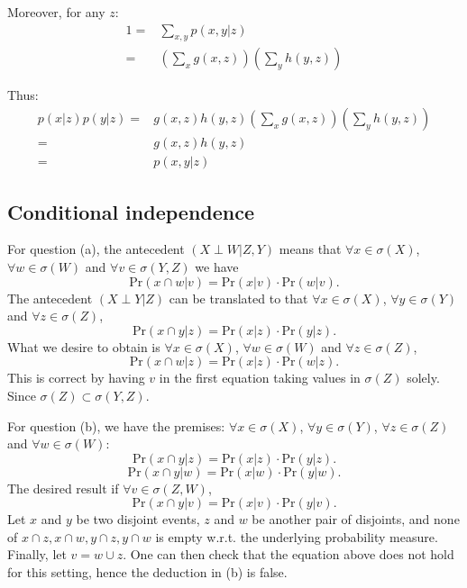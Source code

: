 \documentclass[UTF8]{ctexart}
\begin{document}
Moreover, for any $z$:
\begin{align}
1=&\sum_{x,y}p(x,y|z) \nonumber \\
=&(\sum_{x}g(x,z))(\sum_{y}h(y,z)) \nonumber
\end{align}

Thus:
\begin{align}
p(x|z)p(y|z)=&g(x,z)h(y,z)(\sum_{x}g(x,z))(\sum_{y}h(y,z)) \nonumber \\
=&g(x,z)h(y,z) \nonumber \\
=&p(x,y|z) \nonumber
\end{align}

\subsection{Conditional independence}
For question (a), the antecedent $(X\perp W|Z,Y)$ means that $\forall x\in\sigma(X)$, $\forall w\in\sigma(W)$ and $\forall v\in\sigma(Y,Z)$ we have
$$\text{Pr}(x\cap w|v)=\text{Pr}(x|v)\cdot\text{Pr}(w|v).$$
The antecedent $(X\perp Y|Z)$ can be translated to that $\forall x\in\sigma(X)$, $\forall y\in\sigma(Y)$ and $\forall z\in\sigma(Z)$,
$$\text{Pr}(x\cap y|z)=\text{Pr}(x|z)\cdot\text{Pr}(y|z).$$
What we desire to obtain is $\forall x\in\sigma(X)$, $\forall w\in\sigma(W)$ and $\forall z\in\sigma(Z)$,
$$\text{Pr}(x\cap w|z)=\text{Pr}(x|z)\cdot\text{Pr}(w|z).$$
This is correct by having $v$ in the first equation taking values in $\sigma(Z)$ solely.
Since $\sigma(Z)\subset \sigma(Y,Z)$.

For question (b), we have the premises: $\forall x\in\sigma(X)$, $\forall y\in\sigma(Y)$, $\forall z \in\sigma(Z)$ and $\forall w\in\sigma(W)$:
$$\text{Pr}(x\cap y|z)=\text{Pr}(x|z)\cdot\text{Pr}(y|z).$$
$$\text{Pr}(x\cap y|w)=\text{Pr}(x|w)\cdot\text{Pr}(y|w).$$
The desired result if $\forall v\in\sigma(Z,W)$,
$$\text{Pr}(x\cap y|v)=\text{Pr}(x|v)\cdot\text{Pr}(y|v).$$
Let $x$ and $y$ be two disjoint events, $z$ and $w$ be another pair of disjoints, and none of $x\cap z,x\cap w, y\cap z,y\cap w$ is empty w.r.t. the underlying probability measure.
Finally, let $v=w\cup z$.
One can then check that the equation above does not hold for this setting, hence the deduction in (b) is false.
\end{document}
